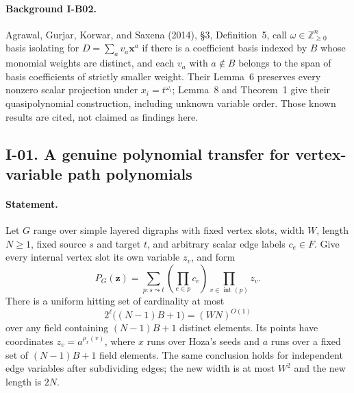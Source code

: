 \documentclass[11pt,a4paper]{article}
\theoremstyle{definition}\newtheorem{definition}{Definition}
\begin{document}
\paragraph{Background I-B02.}
Agrawal, Gurjar, Korwar, and Saxena (2014), \S3, Definition~5, call
$\omega\in\mathbb Z_{\geq0}^{n}$ basis isolating for
$D=\sum_a v_a\mathbf x^a$ if there is a coefficient basis indexed by $B$
whose monomial weights are distinct, and each $v_a$ with $a\notin B$
belongs to the span of basis coefficients of strictly smaller weight.
Their Lemma~6 preserves every nonzero scalar projection under
$x_i=t^{\omega_i}$; Lemma~8 and Theorem~1 give their quasipolynomial
construction, including unknown variable order.  Those known results
are cited, not claimed as findings here.

\subsection{I-01. A genuine polynomial transfer for vertex-variable path polynomials}
\label{I-01}

\paragraph{Statement.}
Let $G$ range over simple layered digraphs with fixed vertex slots,
width $W$, length $N\ge1$, fixed source $s$ and target $t$, and arbitrary
scalar edge labels $c_e\in F$.  Give every internal vertex slot its own
variable $z_v$, and form
\[
 P_G(\mathbf z)=\sum_{p:s\leadsto t}\left(\prod_{e\in p}c_e\right)
                        \prod_{v\in\operatorname{int}(p)}z_v.
\]
There is a uniform hitting set of cardinality at most
\[
 2^{\ell}\bigl((N-1)B+1\bigr)=(WN)^{O(1)}
\tag{I.2}
\]
over any field containing $(N-1)B+1$ distinct elements.  Its points have
coordinates $z_v=a^{\rho_x(v)}$, where $x$ runs over Hoza's seeds and
$a$ runs over a fixed set of $(N-1)B+1$ field elements.  The same conclusion
holds for independent edge variables after subdividing edges; the new
width is at most $W^2$ and the new length is $2N$.
\end{document}
